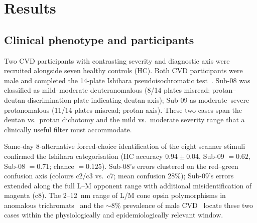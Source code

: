 
\section{Results}
\label{sec:results}

\subsection{Clinical phenotype and participants}
\label{sec:results:behavior}

Two CVD participants with contrasting severity and diagnostic axis were
recruited alongside seven healthy controls (HC). Both CVD participants were
male and completed the 14-plate Ishihara pseudoisochromatic
test~\cite{ishihara1917}. Sub-08 was classified as mild--moderate
deuteranomalous (8/14 plates misread; protan--deutan discrimination plate
indicating deutan axis); Sub-09 as moderate--severe protanomalous (11/14
plates misread; protan axis). These two cases span the deutan vs.\ protan
dichotomy and the mild vs.\ moderate severity range that a clinically useful
filter must accommodate.

Same-day 8-alternative forced-choice identification of the eight scanner
stimuli confirmed the Ishihara categorisation (HC accuracy
$0.94 \pm 0.04$, Sub-09 $= 0.62$, Sub-08 $= 0.71$; chance $= 0.125$).
Sub-08's errors clustered on the red--green confusion axis (colours c2/c3
vs.\ c7; mean confusion $28\%$); Sub-09's errors extended along the full
L--M opponent range with additional misidentification of magenta (c8).
The 2--12~nm range of L/M cone opsin polymorphisms in anomalous
trichromats~\cite{neitz2011, deeb2005} and the $\sim$8\% prevalence of
male CVD~\cite{bosten2019} locate these two cases within the
physiologically and epidemiologically relevant window.

